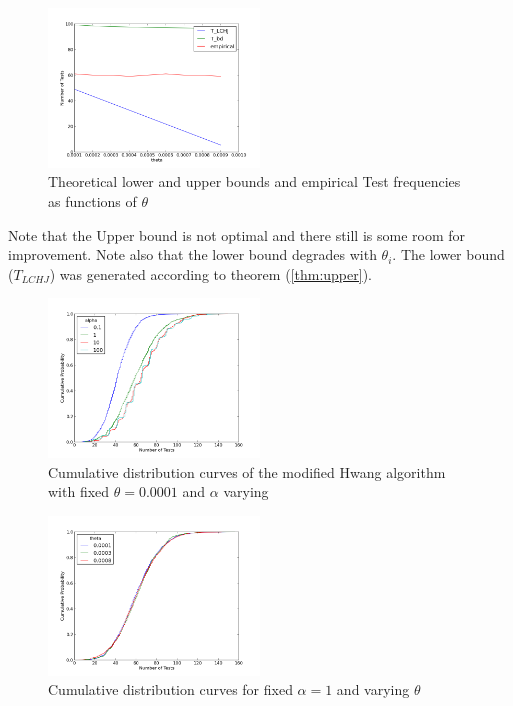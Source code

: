 \begin{figure}[h]
\centering
\includegraphics[width=0.5\textwidth]{ubvslb.png}
\caption{Theoretical lower and upper bounds and empirical Test frequencies as functions of \(\theta\)}
\label{ubvslb}
\end{figure}

Note that the Upper bound is not optimal and there still is some room for improvement. Note also that the lower bound degrades with \(\theta_i \). The lower bound (\(T_{LCHJ}\)) was generated according to theorem (\ref{thm:upper}). 

\begin{figure}[h]
\centering
\includegraphics[width=0.5\textwidth]{variousalpha.png}
\caption{Cumulative distribution curves of the modified Hwang algorithm with fixed \(\theta = 0.0001\) and \(\alpha\) varying }
\label{testsvsalpha}
\end{figure}

\begin{figure}[h]
\centering
\includegraphics[width=0.5\textwidth]{nicegraphlaminar.png}
\caption{Cumulative distribution curves for fixed \(\alpha = 1\) and varying \(\theta\)}
\label{testsvstheta}
\end{figure}

